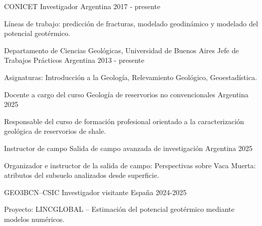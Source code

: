 

\begin{cventries}

\cventry
    {CONICET}
    {Investigador}
    {Argentina}
    {2017 - presente}
    {
      \begin{cvitems} %
        \item {Líneas de trabajo: predicción de fracturas, modelado geodinámico y modelado del potencial geotérmico.}
      \end{cvitems}
    }

\cventry
    {Departamento de Ciencias Geológicas, Universidad de Buenos Aires}
    {Jefe de Trabajos Prácticos}
    {Argentina}
    {2013 - presente}
    {
      \begin{cvitems} %
        \item {Asignaturas: Introducción a la Geología, Relevamiento Geológico, Geoestadística.}
      \end{cvitems}
    }


\cventry
    {Docente a cargo del curso}
    {Geología de reservorios no convencionales}
    {Argentina}
    {2025}
    {
      \begin{cvitems} %
        \item {Responsable del curso de formación profesional orientado a la caracterización geológica de reservorios de shale.}
      \end{cvitems}
    }

\cventry
    {Instructor de campo}
    {Salida de campo avanzada de investigación}
    {Argentina}
    {2025}
    {
      \begin{cvitems} %
        \item {Organizador e instructor de la salida de campo: Perspectivas sobre Vaca Muerta: atributos del subsuelo analizados desde superficie.}
      \end{cvitems}
    }
 
\cventry
    {GEO3BCN–CSIC}
    {Investigador visitante}
    {España}
    {2024-2025}
    {
      \begin{cvitems} %
        \item {Proyecto: LINCGLOBAL – Estimación del potencial geotérmico mediante modelos numéricos.}
      \end{cvitems}
    }




\end{cventries}
